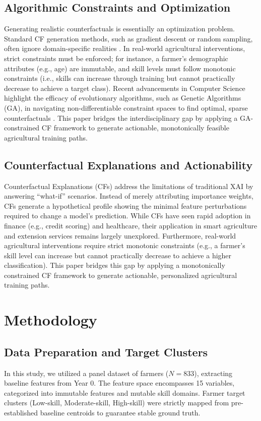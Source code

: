 \documentclass[12pt, a4paper]{article}
\begin{document}
\subsection{Algorithmic Constraints and Optimization}
Generating realistic counterfactuals is essentially an optimization problem. Standard CF generation methods, such as gradient descent or random sampling, often ignore domain-specific realities \cite{placeholder7_cf_optimization}. In real-world agricultural interventions, strict constraints must be enforced; for instance, a farmer's demographic attributes (e.g., age) are immutable, and skill levels must follow monotonic constraints (i.e., skills can increase through training but cannot practically decrease to achieve a target class). Recent advancements in Computer Science highlight the efficacy of evolutionary algorithms, such as Genetic Algorithms (GA), in navigating non-differentiable constraint spaces to find optimal, sparse counterfactuals \cite{placeholder8_ga_cf}. This paper bridges the interdisciplinary gap by applying a GA-constrained CF framework to generate actionable, monotonically feasible agricultural training paths.

\subsection{Counterfactual Explanations and Actionability}
Counterfactual Explanations (CFs) address the limitations of traditional XAI by answering ``what-if'' scenarios. Instead of merely attributing importance weights, CFs generate a hypothetical profile showing the minimal feature perturbations required to change a model's prediction. While CFs have seen rapid adoption in finance (e.g., credit scoring) and healthcare, their application in smart agriculture and extension services remains largely unexplored. Furthermore, real-world agricultural interventions require strict monotonic constraints (e.g., a farmer's skill level can increase but cannot practically decrease to achieve a higher classification). This paper bridges this gap by applying a monotonically constrained CF framework to generate actionable, personalized agricultural training paths.

\section{Methodology}\label{sec3}
\subsection{Data Preparation and Target Clusters}
In this study, we utilized a panel dataset of farmers ($N=833$), extracting baseline features from Year 0. The feature space encompasses 15 variables, categorized into immutable features and mutable skill domains. Farmer target clusters (Low-skill, Moderate-skill, High-skill) were strictly mapped from pre-established baseline centroids to guarantee stable ground truth.
\end{document}
